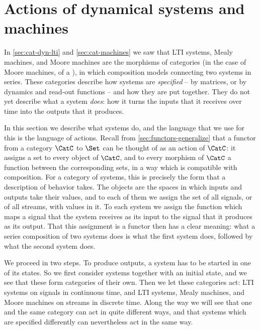 

\section{Actions of dynamical systems and machines}
\label{sec:system-actions}

In \cref{sec:cat-dyn-lti} and \cref{sec:cat-machines} we saw that LTI systems, Mealy machines, and Moore machines are the morphisms of categories (in the case of Moore machines, of a ), in which composition models connecting two systems in series.
These categories describe how systems are \emph{specified} -- by matrices, or by dynamics and read-out functions -- and how they are put together.
They do not yet describe what a system \emph{does}: how it turns the inputs that it receives over time into the outputs that it produces.

In this section we describe what systems do, and the language that we use for this is the language of actions.
Recall from \cref{sec:functors-generalize} that a functor from a category $\CatC$ to $\Set$ can be thought of as an action of $\CatC$: it assigns a set to every object of $\CatC$, and to every morphism of $\CatC$ a function between the corresponding sets, in a way which is compatible with composition.
For a category of systems, this is precisely the form that a description of behavior takes.
The objects are the spaces in which inputs and outputs take their values, and to each of them we assign the set of all signals, or of all streams, with values in it.
To each system we assign the function which maps a signal that the system receives as its input to the signal that it produces as its output.
That this assignment is a functor then has a clear meaning: what a series composition of two systems does is what the first system does, followed by what the second system does.

We proceed in two steps.
To produce outputs, a system has to be started in one of its states.
So we first consider systems together with an initial state, and we see that these form categories of their own.
Then we let these categories act: LTI systems on signals in continuous time, and LTI systems, Mealy machines, and Moore machines on streams in discrete time.
Along the way we will see that one and the same category can act in quite different ways, and that systems which are specified differently can nevertheless act in the same way.

